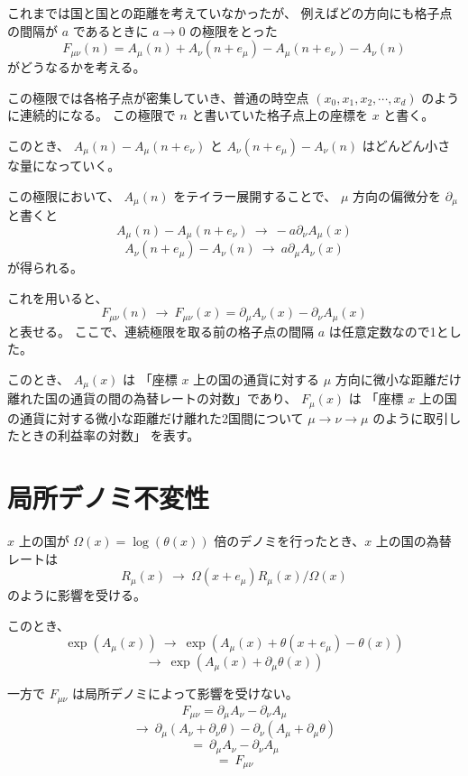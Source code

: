 \documentclass[uplatex]{jsarticle}
\begin{document}
これまでは国と国との距離を考えていなかったが、
例えばどの方向にも格子点の間隔が $a$ であるときに
$a \to 0$
の極限をとった
$$
	F_{\mu \nu}(n) =
	A_{\mu}(n) + A_{\nu}(n+e_{\mu})
	- A_{\mu}(n+e_{\nu})
	- A_{\nu}(n)
$$
がどうなるかを考える。

この極限では各格子点が密集していき、普通の時空点
$(x_{0},x_{1},x_{2},\cdots,x_{d})$ のように連続的になる。
この極限で $n$ と書いていた格子点上の座標を $x$ と書く。

このとき、
$
	A_{\mu}(n) - A_{\mu}(n+e_{\nu})
$
と
$
	A_{\nu}(n+e_{\mu}) - A_{\nu}(n)
$
はどんどん小さな量になっていく。

この極限において、
$A_{\mu}(n)$ をテイラー展開することで、
$\mu$ 方向の偏微分を $\partial_{\mu}$と書くと
$$
	A_{\mu}(n) - A_{\mu}(n+e_{\nu})
	\ \to \
	- a \partial_{\nu} A_{\mu} (x)
$$
$$
	A_{\nu}(n+e_{\mu}) - A_{\nu}(n)
	\ \to \
	a \partial_{\mu} A_{\nu} (x)
$$
が得られる。

これを用いると、
$$
	F_{\mu \nu}(n)
	\ \to \
	F_{\mu \nu}(x)
	=
	\partial_{\mu} A_{\nu} (x)
	-
	\partial_{\nu} A_{\mu} (x)
$$
と表せる。
ここで、連続極限を取る前の格子点の間隔 $a$ は任意定数なので1とした。

このとき、
$A_{\mu} (x)$
は
「座標 $x$ 上の国の通貨に対する $\mu$ 方向に微小な距離だけ離れた国の通貨の間の為替レートの対数」であり、
$F_{\mu} (x)$
は
「座標 $x$ 上の国の通貨に対する微小な距離だけ離れた2国間について $\mu \to \nu \to \mu$ のように取引したときの利益率の対数」
を表す。




\section{局所デノミ不変性}

$x$ 上の国が $\Omega(x) = \log (\theta (x))$ 倍のデノミを行ったとき、$x$ 上の国の為替レートは
$$
	R_{\mu}(x) \ \to \ \Omega(x + e_{\mu}) R_{\mu}(x) / \Omega(x)
$$
のように影響を受ける。

このとき、
$$
	\exp (A_{\mu}(x))
	\ \to \
	\exp (A_{\mu}(x) + \theta(x+e_{\mu}) - \theta(x))
$$
$$
	\to \ \exp (A_{\mu}(x) + \partial_{\mu} \theta (x))
$$

一方で
$F_{\mu \nu}$ は局所デノミによって影響を受けない。
$$
	F_{\mu \nu}
	=
	\partial_{\mu} A_{\nu}
	-
	\partial_{\nu} A_{\mu}
$$
$$
	\to \
	\partial_{\mu} ( A_{\nu} + \partial_{\nu} \theta )
	-
	\partial_{\nu} ( A_{\mu} + \partial_{\mu} \theta )
$$
$$
	= \
	\partial_{\mu} A_{\nu}
	-
	\partial_{\nu} A_{\mu}
$$
$$
	= \
	F_{\mu \nu}
$$
\end{document}
